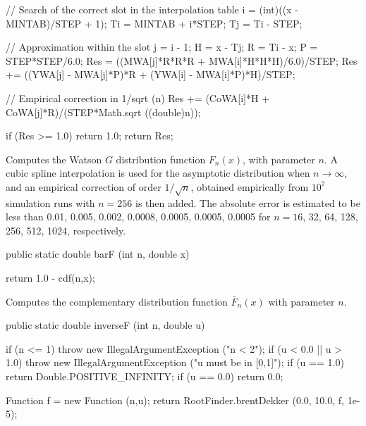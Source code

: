 \begin{code}
\begin{hide}
{      // Search of the correct slot in the interpolation table
      i = (int)((x - MINTAB)/STEP + 1);
      Ti = MINTAB + i*STEP;
      Tj = Ti - STEP;

      // Approximation within the slot
      j = i - 1;
      H = x - Tj;
      R = Ti - x;
      P = STEP*STEP/6.0;
      Res = ((MWA[j]*R*R*R + MWA[i]*H*H*H)/6.0)/STEP;
      Res += ((YWA[j] - MWA[j]*P)*R + (YWA[i] - MWA[i]*P)*H)/STEP;

      // Empirical correction in 1/sqrt (n)
      Res += (CoWA[i]*H + CoWA[j]*R)/(STEP*Math.sqrt ((double)n));

      if (Res >= 1.0)
         return 1.0;
      return Res;
   }\end{hide}
\end{code}
\begin{tabb}
  Computes the Watson $G$ distribution function $F_n(x)$, with parameter $n$.
  A cubic spline interpolation is used for the asymptotic distribution when
  $n\to \infty$, and an empirical correction of order $1/\sqrt{n}$, obtained
  empirically from $10^7$ simulation runs with $n = 256$ is then added.
  The  absolute  error is estimated to be less than 
  0.01, 0.005, 0.002, 0.0008, 0.0005, 0.0005, 0.0005 for 
  $n = 16$, 32, 64, 128, 256, 512, 1024, respectively.
 \end{tabb}
\begin{code}

   public static double barF (int n, double x)\begin{hide} {
      return 1.0 - cdf(n,x);
   }\end{hide}
\end{code}
\begin{tabb}
  Computes the complementary distribution function  $\bar F_n(x)$ 
  with parameter $n$.
\end{tabb}
\begin{code}

   public static double inverseF (int n, double u)\begin{hide} {
      if (n <= 1)
         throw new IllegalArgumentException ("n < 2");
      if (u < 0.0 || u > 1.0)
         throw new IllegalArgumentException ("u must be in [0,1]");
      if (u == 1.0)
         return Double.POSITIVE_INFINITY;
      if (u == 0.0)
         return 0.0;

      Function f = new Function (n,u);
      return RootFinder.brentDekker (0.0, 10.0, f, 1e-5);
   }\end{hide}
\end{code}
